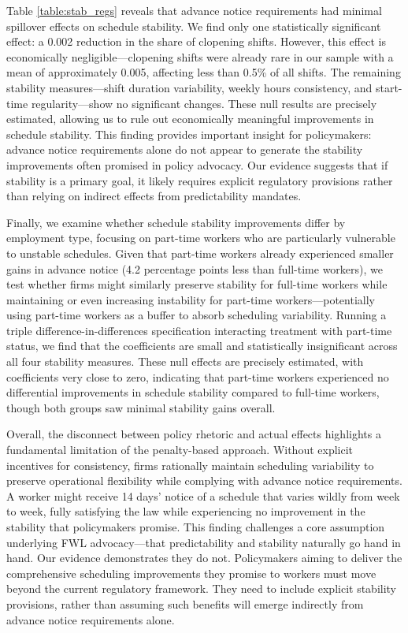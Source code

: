 \documentclass[letterpaper,11pt,leqno]{article}
\theoremstyle{paper}
\begin{document}
Table \ref{table:stab_regs} reveals that advance notice requirements had minimal spillover effects on schedule stability. We find only one statistically significant effect: a 0.002 reduction in the share of clopening shifts. However, this effect is economically negligible—clopening shifts were already rare in our sample with a mean of approximately 0.005, affecting less than 0.5\% of all shifts. The remaining stability measures—shift duration variability, weekly hours consistency, and start-time regularity—show no significant changes. These null results are precisely estimated, allowing us to rule out economically meaningful improvements in schedule stability. This finding provides important insight for policymakers: advance notice requirements alone do not appear to generate the stability improvements often promised in policy advocacy. Our evidence suggests that if stability is a primary goal, it likely requires explicit regulatory provisions rather than relying on indirect effects from predictability mandates.

Finally, we examine whether schedule stability improvements differ by employment type, focusing on part-time workers who are particularly vulnerable to unstable schedules. Given that part-time workers already experienced smaller gains in advance notice (4.2 percentage points less than full-time workers), we test whether firms might similarly preserve stability for full-time workers while maintaining or even increasing instability for part-time workers—potentially using part-time workers as a buffer to absorb scheduling variability. Running a triple difference-in-differences specification interacting treatment with part-time status, we find that the coefficients are small and statistically insignificant across all four stability measures. These null effects are precisely estimated, with coefficients very close to zero, indicating that part-time workers experienced no differential improvements in schedule stability compared to full-time workers, though both groups saw minimal stability gains overall.


Overall, the disconnect between policy rhetoric and actual effects highlights a fundamental limitation of the penalty-based approach. Without explicit incentives for consistency, firms rationally maintain scheduling variability to preserve operational flexibility while complying with advance notice requirements. A worker might receive 14 days' notice of a schedule that varies wildly from week to week, fully satisfying the law while experiencing no improvement in the stability that policymakers promise. This finding challenges a core assumption underlying FWL advocacy—that predictability and stability naturally go hand in hand. Our evidence demonstrates they do not. Policymakers aiming to deliver the comprehensive scheduling improvements they promise to workers must move beyond the current regulatory framework. They need to include explicit stability provisions, rather than assuming such benefits will emerge indirectly from advance notice requirements alone.
\end{document}
